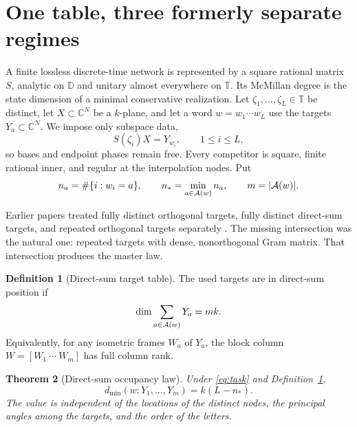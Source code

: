 \documentclass[11pt]{article}
\newtheorem{theorem}{Theorem}[section]
\theoremstyle{definition}\newtheorem{definition}[theorem]{Definition}\newtheorem{example}[theorem]{Example}
\theoremstyle{remark}\newtheorem{remark}[theorem]{Remark}\newtheorem{limitation}[theorem]{Limitation}
\newcommand{\C}{\mathbb C}\newcommand{\D}{\mathbb D}\newcommand{\T}{\mathbb T}
\begin{document}
\section{One table, three formerly separate regimes}

A finite lossless discrete-time network is represented by a square rational
matrix $S$, analytic on $\D$ and unitary almost everywhere on $\T$.  Its
McMillan degree is the state dimension of a minimal conservative
realization.  Let $\zeta_1,\ldots,\zeta_L\in\T$ be distinct, let
$X\subset\C^N$ be a $k$-plane, and let a word
$w=w_1\cdots w_L$ use the targets $Y_a\subset\C^N$.  We impose only
subspace data,
\begin{equation}\label{eq:task}
                         S(\zeta_i)X=Y_{w_i},\qquad 1\le i\le L,
\end{equation}
so bases and endpoint phases remain free.  Every competitor is square,
finite rational inner, and regular at the interpolation nodes.  Put
\[
 n_a=\#\{i:w_i=a\},\qquad n_*=\min_{a\in\mathcal A(w)}n_a,
 \qquad m=|\mathcal A(w)|.
\]

Earlier papers treated fully distinct orthogonal targets, fully distinct
direct-sum targets, and repeated orthogonal targets separately
\cite{ErikssonOrthogonal2026,ErikssonDirectSum2026,ErikssonRoutingWord2026}.
The missing intersection was the natural one: repeated targets with dense,
nonorthogonal Gram matrix.  That intersection produces the master law.

\begin{definition}[Direct-sum target table]\label{def:direct-sum}
The used targets are in direct-sum position if
\begin{equation}\label{eq:direct-sum}
               \dim\sum_{a\in\mathcal A(w)}Y_a=mk.
\end{equation}
Equivalently, for any isometric frames $W_a$ of $Y_a$, the block column
$W=[W_1\ \cdots\ W_m]$ has full column rank.
\end{definition}

\begin{theorem}[Direct-sum occupancy law]\label{thm:master}
Under \eqref{eq:task} and Definition~\ref{def:direct-sum},
\begin{equation}\label{eq:master}
 \boxed{\qquad d_{\min}(w;Y_1,\ldots,Y_m)=k(L-n_*).\qquad}
\end{equation}
The value is independent of the locations of the distinct nodes, the
principal angles among the targets, and the order of the letters.
\end{theorem}
\end{document}
